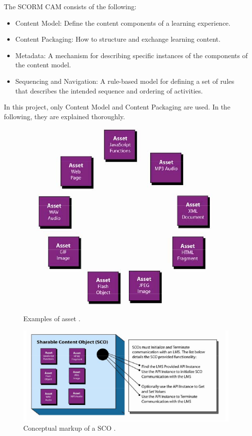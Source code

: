 The SCORM CAM consists of the following:
\begin{itemize}
	\item
		Content Model: Define the content components of a learning experience.
	\item
		Content Packaging: How to structure and exchange learning content.
	\item
		Metadata: A mechanism for describing specific instances of the components of the content model.
	\item
		Sequencing and Navigation: A rule-based model for defining a set of rules that describes the intended sequence and ordering of activities.
\end{itemize}
In this project, only Content Model and Content Packaging are used. In the following, they are explained thoroughly.
\begin{figure}[t]
	\begin{center}
		\includegraphics[scale=0.4]{asset.png}
	\end{center}
	\caption{Examples of asset \cite{cambook}.}
	\label{fig:asset}
\end{figure}
\begin{figure}[t]
	\begin{center}
		\includegraphics[scale=0.4]{sco.png}
	\end{center}
	\caption{Conceptual markup of a SCO \cite{cambook}.}
	\label{fig:sco}
\end{figure}

